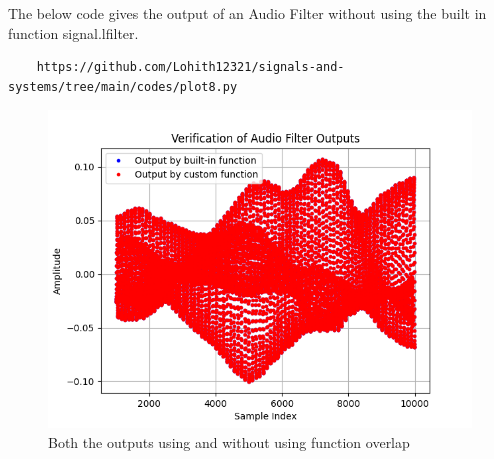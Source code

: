 \documentclass[journal,12pt,twocolumn]{IEEEtran}
\theoremstyle{remark}
\begin{document}
\begin{enumerate}[label=\thesection.\arabic*
,ref=\thesection.\theenumi]
\begin{enumerate}[label=\thesection.\arabic*
,ref=\thesection.\theenumi]
\solution The below code gives the output of an Audio Filter without using the built in function signal.lfilter.
\begin{lstlisting}
    https://github.com/Lohith12321/signals-and-systems/tree/main/codes/plot8.py 
\end{lstlisting}

\begin{figure}[ht]
\centering
\includegraphics[width=\columnwidth]{figs/plot8.png}
\caption{Both the outputs using and without using function overlap}
\label{fig:plot8}
\end{figure}


\end{enumerate}
\end{enumerate}
\end{document}
